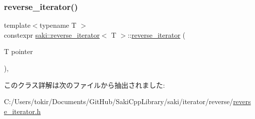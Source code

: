 \subsubsection{\texorpdfstring{reverse\+\_\+iterator()}{reverse\_iterator()}}
{\footnotesize\ttfamily template$<$typename T $>$ \\
constexpr \mbox{\hyperlink{classsaki_1_1reverse__iterator}{saki\+::reverse\+\_\+iterator}}$<$ T $>$\+::\mbox{\hyperlink{classsaki_1_1reverse__iterator}{reverse\+\_\+iterator}} (\begin{DoxyParamCaption}\item[{T}]{pointer }\end{DoxyParamCaption})\hspace{0.3cm}{\ttfamily [inline]}, {\ttfamily [explicit]}}



このクラス詳解は次のファイルから抽出されました\+:\begin{DoxyCompactItemize}
\item 
C\+:/\+Users/tokir/\+Documents/\+Git\+Hub/\+Saki\+Cpp\+Library/saki/iterator/reverse/\mbox{\hyperlink{reverse__iterator_8h}{reverse\+\_\+iterator.\+h}}\end{DoxyCompactItemize}
